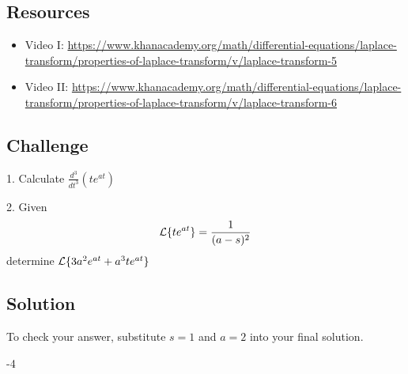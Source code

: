 \subsection*{Resources}
\begin{itemize}
    \item Video I: \url{https://www.khanacademy.org/math/differential-equations/laplace-transform/properties-of-laplace-transform/v/laplace-transform-5}
    \item Video II: \url{https://www.khanacademy.org/math/differential-equations/laplace-transform/properties-of-laplace-transform/v/laplace-transform-6}
\end{itemize}

\subsection*{Challenge}
1. Calculate $\displaystyle \frac{d^3}{dt^3} \left( t e^{a t} \right)$

2. Given
\begin{equation}
    \mathcal{L}\{t e^{a t}\} = \frac{1}{(a-s)^2}
\end{equation}
determine $\mathcal{L}\{3a^2 e^{at} + a^3te^{at}\}$

\subsection*{Solution}
To check your answer, substitute $s=1$ and $a=2$ into your final solution.

-4
